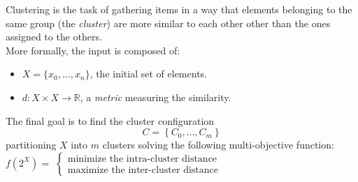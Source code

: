 Clustering is the task of gathering items in a way that elements belonging
to the same group (the \emph{cluster}) are more similar to each other other than the ones
assigned to the others.\\
More formally, the input is composed of:
\begin{itemize}
    \item $X = \{x_0, \dots ,x_n\}$, the initial set of elements.
    \item $d: X \times X \to \mathbb{R}$, a \emph{metric} measuring the similarity.
\end{itemize}
The final goal is to find the cluster configuration
\begin{equation*}
    C = \left\{ C_0, \dots , C_m \right\}
\end{equation*}
partitioning $X$
into $m$ clusters solving the following multi-objective function:\\

$f\left(2^X\right) =$
\begin{math}
    \left\{
        \begin{array}{l}
            \text{minimize the intra-cluster distance}
            \\
            \text{maximize the inter-cluster distance}
        \end{array}
    \right.
\end{math}\\
